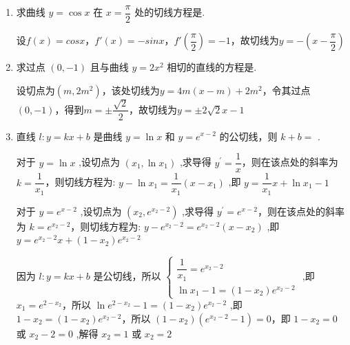 \begin{enumerate}
\begin{jieda}
        因为两函数定义域均为$\mathbf{R}$，故$g(x)$有对称中心$\left(\dfrac{3}{2}, 0\right)$，故$g(x)$周期为$2$，故正确.
    \end{jieda}
    
    \item 求曲线 $y = \cos x$ 在 $x = \dfrac{\pi }{2}$ 处的切线方程是.
    \begin{jieda}
        设$f(x) = cosx$，$f'(x) = -sinx$，$f'\left(\dfrac{\pi}{2}\right) = -1$，故切线为$y = -\left(x-\dfrac{\pi}{2}\right)$
    \end{jieda}

    \item 求过点 $\left( {0, - 1}\right)$ 且与曲线 $y = 2{x}^{2}$ 相切的直线的方程是.
    \begin{jieda}
        设切点为$(m, 2m^2)$，该处切线为$y = 4m(x-m)+2m^2$，令其过点 $\left( {0, - 1}\right)$，得到$m = \pm \dfrac{\sqrt{2}}{2}$，故切线为$y = \pm 2\sqrt{2}x-1$
    \end{jieda}
    
    \item 直线 $l : y = {kx} + b$ 是曲线 $y = \ln x$ 和 $y = {{e}}^{x - 2}$ 的公切线，则 $k + b =$ .
    \begin{jieda}
        对于 $y = \ln x$ ,设切点为 $\left( {{x}_{1},\ln {x}_{1}}\right)$ ,求导得 ${y}^{\prime } = \dfrac{1}{x}$，则在该点处的斜率为 $k = \dfrac{1}{{x}_{1}}$，则切线方程为: $y - \ln {x}_{1} = \dfrac{1}{{x}_{1}}\left( {x - {x}_{1}}\right)$ ,即 $y = \dfrac{1}{{x}_{1}}x + \ln {x}_{1} - 1$
        
        对于 $y = {{e}}^{x - 2}$ ,设切点为 $\left( {{x}_{2},{{e}}^{{x}_{2} - 2}}\right)$ ,求导得 ${y}^{\prime } = {{e}}^{x - 2}$，则在该点处的斜率为 $k = {{e}}^{{x}_{2} - 2}$，则切线方程为: $y - {{e}}^{{x}_{2} - 2} = {{e}}^{{x}_{2} - 2}\left( {x - {x}_{2}}\right)$ ,即 $y = {{e}}^{{x}_{2} - 2}x + \left( {1 - {x}_{2}}\right) {{e}}^{{x}_{2} - 2}$
        
        因为 $l : y = {kx} + b$ 是公切线，所以 $\left\{  \begin{array}{l} \dfrac{1}{{x}_{1}} = {{e}}^{{x}_{2} - 2} \\  \ln {x}_{1} - 1 = \left( {1 - {x}_{2}}\right) {{e}}^{{x}_{2} - 2} \end{array}\right.$ ,即 ${x}_{1} = {{e}}^{2 - {x}_{2}}$，所以 $\ln {{e}}^{2 - {x}_{2}} - 1 = \left( {1 - {x}_{2}}\right) {{e}}^{{x}_{2} - 2}$ ,即 $1 - {x}_{2} = \left( {1 - {x}_{2}}\right) {{e}}^{{x}_{2} - 2}$，所以 $\left( {1 - {x}_{2}}\right) \left( {{{e}}^{{x}_{2} - 2} - 1}\right)  = 0$，即 $1 - {x}_{2} = 0$ 或 ${x}_{2} - 2 = 0$ ,解得 ${x}_{2} = 1$ 或 ${x}_{2} = 2$
        

\end{jieda}
\end{enumerate}
